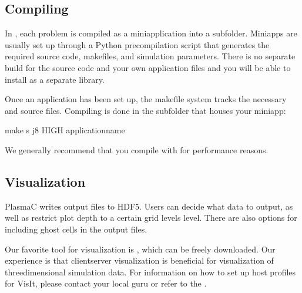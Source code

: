 \documentclass[letterpaper,10pt,english]{sphinxmanual}
\begin{document}
\subsection{Compiling }
\label{\detokenize{GettingStarted:compiling-plasmac}}\label{\detokenize{GettingStarted:chap-compiling}}
In , each problem is compiled as a mini\sphinxhyphen{}application into a subfolder.
Mini\sphinxhyphen{}apps are usually set up through a Python pre\sphinxhyphen{}compilation script that generates the required source code, makefiles, and simulation parameters.
There is no separate build for the  source code and your own application files and you will  be able to install  as a separate library.

Once an application has been set up, the makefile system tracks the necessary  and  source files.
Compiling is done in the subfolder that houses your mini\sphinxhyphen{}app:

\begin{sphinxVerbatim}[commandchars=\\\{\},formatcom=\scriptsize]
make \PYGZhy{}s \PYGZhy{}j8  HIGH \PYGZlt{}application\PYGZus{}name\PYGZgt{}
\end{sphinxVerbatim}

We generally recommend that you compile with  for performance reasons.


\subsection{Visualization}
\label{\detokenize{GettingStarted:visualization}}
PlasmaC writes output files to HDF5. Users can decide what data to output, as well as restrict plot depth to a certain grid levels level. There are also options for including ghost cells in the output files.

Our favorite tool for visualization is , which can be freely downloaded. Our experience is that client\sphinxhyphen{}server visualization is beneficial for visualization of three\sphinxhyphen{}dimensional simulation data. For information on how to set up host profiles for VisIt, please contact your local guru or refer to the .
\end{document}

